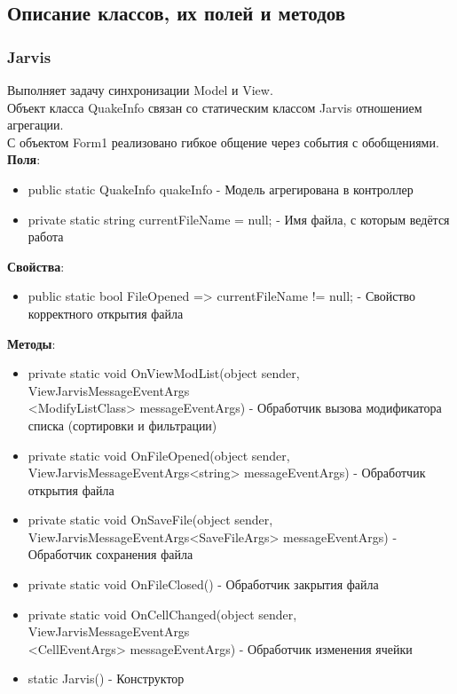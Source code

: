 \documentclass[a4paper,12pt, fleqn]{article}
\theoremstyle{plain} %
\theoremstyle{definition} %
\theoremstyle{remark} %
\numberwithin{equation}{section}
\begin{document}
\subsection{Описание классов, их полей и методов}

\subsubsection{Jarvis}
Выполняет задачу синхронизации Model и View.\\
Объект класса QuakeInfo связан со статическим классом Jarvis отношением агрегации.\\
С объектом Form1 реализовано гибкое общение через события\cite{Ev} с обобщениями\cite{Gen}\cite{Ev2}.\\[2em]
\textbf{Поля}:
\begin{itemize}
	\item public static QuakeInfo quakeInfo - Модель агрегирована в контроллер
	\item private static string currentFileName = null; - Имя файла, с которым ведётся работа
\end{itemize}


\textbf{Свойства}:

\begin{itemize}
	\item public static bool FileOpened => currentFileName != null; - Свойство корректного открытия файла
\end{itemize}

\textbf{Методы}:
\begin{itemize}
	\item private static void OnViewModList(object sender, ViewJarvisMessageEventArgs\\<ModifyListClass> messageEventArgs) - Обработчик вызова модификатора списка (сортировки и фильтрации)
	\item private static void OnFileOpened(object sender, ViewJarvisMessageEventArgs<string> messageEventArgs) - Обработчик открытия файла
	\item private static void OnSaveFile(object sender, ViewJarvisMessageEventArgs<SaveFileArgs> messageEventArgs) - Обработчик сохранения файла
	\item private static void OnFileClosed() - Обработчик закрытия файла
	\item private static void OnCellChanged(object sender, ViewJarvisMessageEventArgs\\<CellEventArgs> messageEventArgs) - Обработчик изменения ячейки
	\item static Jarvis() - Конструктор
\end{itemize}
\end{document}
